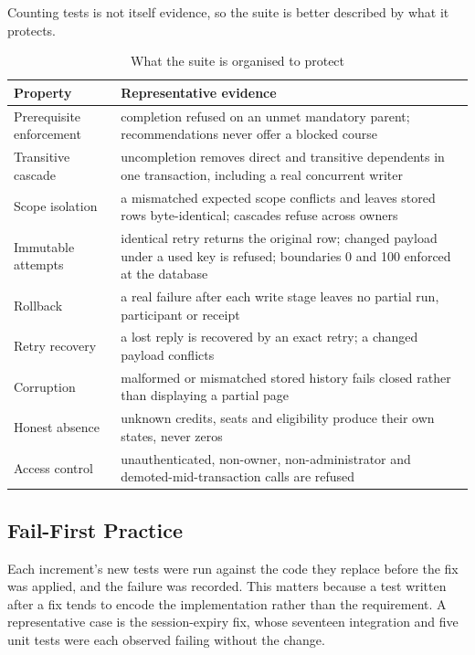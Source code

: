 Counting tests is not itself evidence, so the suite is better described by what it protects.

\begin{table}[h]
\centering
\small
\begin{tabular}{p{}p{}}
\toprule
\textbf{Property} & \textbf{Representative evidence} \\
\midrule
Prerequisite enforcement & completion refused on an unmet mandatory parent; recommendations never
offer a blocked course \\
Transitive cascade & uncompletion removes direct and transitive dependents in one transaction,
including a real concurrent writer \\
Scope isolation & a mismatched expected scope conflicts and leaves stored rows byte-identical;
cascades refuse across owners \\
Immutable attempts & identical retry returns the original row; changed payload under a used key is
refused; boundaries 0 and 100 enforced at the database \\
Rollback & a real failure after each write stage leaves no partial run, participant or receipt \\
Retry recovery & a lost reply is recovered by an exact retry; a changed payload conflicts \\
Corruption & malformed or mismatched stored history fails closed rather than displaying a partial
page \\
Honest absence & unknown credits, seats and eligibility produce their own states, never zeros \\
Access control & unauthenticated, non-owner, non-administrator and demoted-mid-transaction calls
are refused \\
\bottomrule
\end{tabular}
\caption{What the suite is organised to protect}
\end{table}

\subsection{Fail-First Practice}

Each increment's new tests were run against the code they replace before the fix was applied, and
the failure was recorded. This matters because a test written after a fix tends to encode the
implementation rather than the requirement. A representative case is the session-expiry fix, whose
seventeen integration and five unit tests were each observed failing without the change.

